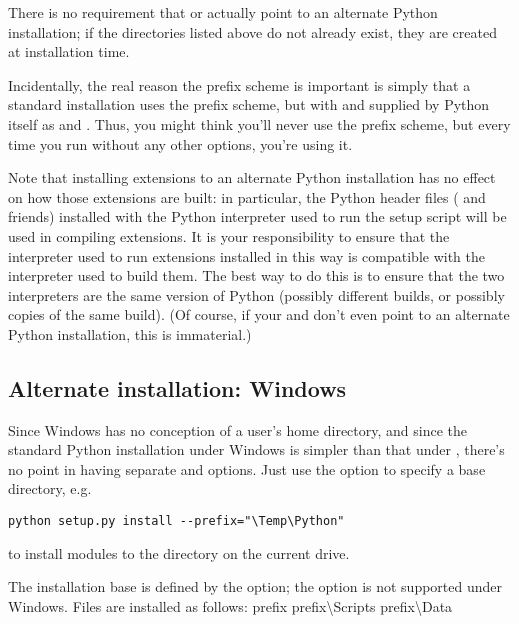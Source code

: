 \documentclass{howto}
\begin{document}
There is no requirement that  or
 actually point to an alternate Python
installation; if the directories listed above do not already exist, they
are created at installation time.

Incidentally, the real reason the prefix scheme is important is simply
that a standard \UNIX{} installation uses the prefix scheme, but with
 and  supplied by
Python itself as  and .  Thus,
you might think you'll never use the prefix scheme, but every time you
run  without any other options, you're
using it.

Note that installing extensions to an alternate Python installation has
no effect on how those extensions are built: in particular, the Python
header files ( and friends) installed with the Python
interpreter used to run the setup script will be used in compiling
extensions.  It is your responsibility to ensure that the interpreter
used to run extensions installed in this way is compatible with the
interpreter used to build them.  The best way to do this is to ensure
that the two interpreters are the same version of Python (possibly
different builds, or possibly copies of the same build).  (Of course, if
your  and  don't even
point to an alternate Python installation, this is immaterial.)


\subsection{Alternate installation: Windows}
\label{alt-install-windows}

Since Windows has no conception of a user's home directory, and since
the standard Python installation under Windows is simpler than that
under \UNIX, there's no point in having separate 
and  options.  Just use the 
option to specify a base directory, e.g.

\begin{verbatim}
python setup.py install --prefix="\Temp\Python"
\end{verbatim}

to install modules to the
 directory on the
current drive.

The installation base is defined by the  option;
the  option is not supported under Windows.
Files are installed as follows:
              {prefix}{}
              {prefix}{\textbackslash{}Scripts}
              {prefix}{\textbackslash{}Data}
\end{document}
